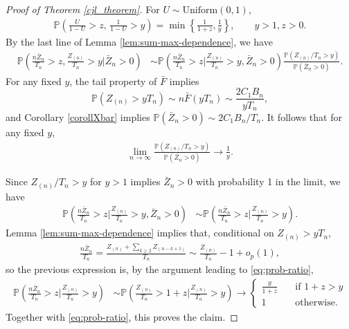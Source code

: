 \documentclass[11pt]{article}
\theoremstyle{definition}
\def\Prob{{\mathbb P}}
\begin{document}
\begin{proof}[Proof of Theorem \ref{cjl_theorem}]
	For $U \sim \text{Uniform}(0,1)$,
	\begin{align*}
	\Prob\left( \frac{U}{1-U}>z ,\, \frac{1}{1-U}>y \right) = \min\left\{\frac{1}{1+z} , \frac{1}{y} \right\},\hspace{2em} y> 1, z> 0.
	\end{align*}
	By the last line of Lemma \ref{lem:sum-max-dependence}, we have
	\begin{align*}
	\Prob\left( \frac{n\bar{Z}_n}{T_n}>z,\frac{Z_{(n)}}{T_n}>y \mathrel{\Big |} \bar{Z}_n>0\right) &\sim \Prob\left( \frac{n\bar{Z}_n}{T_n}>z \mathrel{\Big |} \frac{Z_{(n)}}{T_n}>y, \bar{Z}_n>0 \right) \frac{\Prob\left(Z_{(n)}/T_n>y\right)}{\Prob(\bar{Z}_n>0)}.
	\end{align*}
	For any fixed $y$, the tail property of $\bar{F}$ implies
	\[
	\Prob (Z_{(n)} > yT_n) \sim n\bar{F}(yT_n) \sim \frac{2C_1 B_n}{y T_n} ,
	\]
	and Corollary \ref{corollXbar} implies $
	\Prob(\bar{Z}_n>0) \sim 2C_1 B_n/T_n$. It follows that for any fixed $y$,
	\begin{align}
	\label{eq:prob-ratio}
	\lim_{n \to \infty} \frac{\Prob(Z_{(n)}/T_n>y)}{\Prob(\bar{Z}_n>0)} \to \frac{1}{y}.
	\end{align}
	
	Since $Z_{(n)}/T_n>y$ for $y>1$ implies $\bar{Z}_n>0$ with probability 1 in the limit, we have
	\begin{align*}
	\Prob\left( \frac{n\bar{Z}_n}{T_n}>z \mathrel{\Big |} \frac{Z_{(n)}}{T_n}>y, \bar{Z}_n>0 \right) &\sim \Prob\left( \frac{n\bar{Z}_n}{T_n}>z \mathrel{\Big |} \frac{Z_{(n)}}{T_n}>y \right) .
	\end{align*}
	Lemma \ref{lem:sum-max-dependence} implies that, conditional on $Z_{(n)}>y T_n$, 
	\begin{align*}
	\frac{n\bar{Z}_{n}}{T_n} = \frac{Z_{(n)}+\sum_{k\geq 2}Z_{(n-k+1)}}{T_n} \sim \frac{Z_{(n)}}{T_n}-1+o_p(1),
	\end{align*}
	so the previous expression is, by the argument leading to \eqref{eq:prob-ratio},
	\begin{align*}
	\Prob\left( \frac{n\bar{Z}_n}{T_n}>z \mathrel{\Big |} \frac{Z_{(n)}}{T_n}>y \right) &\sim \Prob\left( \frac{Z_{(n)}}{T_n}>1+z \mathrel{\Big |} \frac{Z_{(n)}}{T_n}>y \right) \to \begin{cases}
	\frac{y}{1+z} \hspace{1em} &\text{if }1+z>y \\
	1 &\text{otherwise}.
	\end{cases}
	\end{align*}
	Together with \eqref{eq:prob-ratio}, this proves the claim.
\end{proof}
\end{document}
